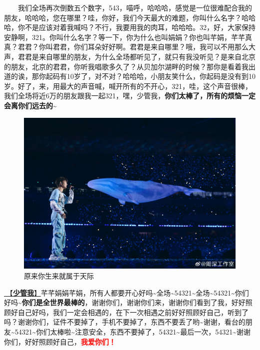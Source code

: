 \documentclass[]{ctexbook}
\begin{document}
  我们全场再次倒数五个数字，543，喵呼，哈哈哈，感觉是一位很难配合我的朋友，哈哈哈，您在哪里？哇，你好，我们今天最大的难题，你叫什么名字？哈哈哈，你不是应该对着我喊吗？不行，我要用我的肉耳，哈哈哈。32，好，大家保持安静啊，321。你叫什么名字？等一下，你为什么也叫娟娟？你也叫芊娟，芊芊真真？君君？你叫君君，你们耳朵好好啊。君君是来自哪里？哦，我可以不用那么大声，君君是来自哪里的朋友，为什么全场都听见了，就只有我没听见？是来自北京的朋友，北京的君君，你听我唱歌多久了？从贝加尔湖畔的时候？那你是看着我出道的诶，那你起码有10岁了，对不对？哈哈哈，小朋友笑什么，你起码是没有到10岁。好了，来，用最大的声音喊，喊开所有的不开心，321，哇，这个声音很棒，我们全场将近6万的朋友跟我一起321，嘿，少管我，\textbf{你们太棒了，所有的烦恼一定会离你们远去的\textasciitilde{}}

\begin{figure}

{\centering \includegraphics[width=400pt]{img/beijing20240921/002} 

}

\caption{原来你生来就属于天际}\label{fig:unnamed-chunk-103}
\end{figure}

\hyperref[watch-ur-manners]{🎵【\textbf{少管我}】}芊芊娟娟芊娟，所有人都要开心好吗\textasciitilde 全场\textasciitilde54321\textasciitilde 全场\textasciitilde54321\textasciitilde 你们好吗\textasciitilde{}\textbf{你们是全世界最棒的}，谢谢你们，谢谢你们来，谢谢你们看到了我，好好照顾好自己好吗，我们一定会相遇的，在下一次相遇之前好好照顾好自己，听到了吗？谢谢你们，证件不要掉了，手机不要掉了，东西不要丢了哟\textasciitilde 谢谢，看台的朋友\textasciitilde54321\textasciitilde 你们太棒啦\textasciitilde 注意安全，东西不要掉了，54321\textasciitilde 最后一次，54321\textasciitilde 谢谢你们，好好照顾好自己，\textbf{\textcolor{red}{我爱你们！}}
\end{document}
